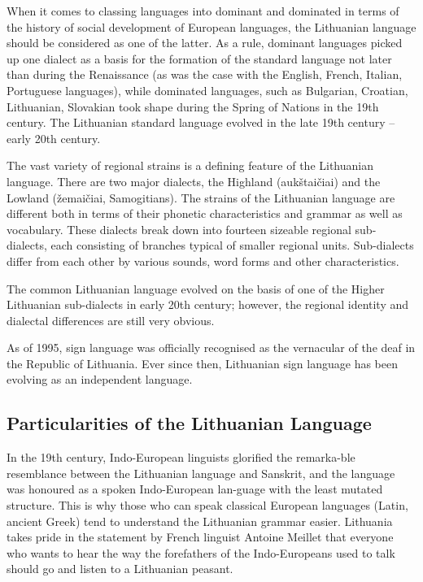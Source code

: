 \documentclass[]{../metanetpaper}
\begin{document}
\begin{multicols}{2}
    When it comes to classing languages into dominant and dominated in terms of the history of social development of European languages, the Lithuanian language should be considered as one of the latter. As a rule, dominant languages picked up one dialect as a basis for the formation of the standard language not later than during the Renaissance (as was the case with the English, French, Italian, Portuguese languages), while dominated languages, such as Bulgarian, Croatian, Lithuanian, Slovakian took shape during the Spring of Nations in the 19th century. The Lithuanian standard language evolved in the late 19th century – early 20th century.

    The vast variety of regional strains is a defining feature of the Lithuanian language. There are two major dialects, the Highland (aukštaičiai) and the Lowland (žemaičiai, Samogitians). The strains of the Lithuanian language are different both in terms of their phonetic characteristics and grammar as well as vocabulary. These dialects break down into fourteen sizeable regional sub-dialects, each consisting of branches typical of smaller regional units. Sub-dialects differ from each other by various sounds, word forms and other characteristics.

The common Lithuanian language evolved on the basis of one of the Higher Lithuanian sub-dialects in early 20th century; however, the regional identity and dialectal differences are still very obvious.

As of 1995, sign language was officially recognised as the vernacular of the deaf in the Republic of Lithuania. Ever since then, Lithuanian sign language has been evolving as an independent language.

\subsection{Particularities of the Lithuanian  Language}

In the 19th century, Indo-European linguists glorified the remarka-ble resemblance between the Lithuanian language and Sanskrit, and the language was honoured as a spoken Indo-European lan-guage with the least mutated structure. This is why those who can speak classical European languages (Latin, ancient Greek) tend to understand the Lithuanian grammar easier. Lithuania takes pride in the statement by French linguist Antoine Meillet that everyone who wants to hear the way the forefathers of the Indo-Europeans used to talk should go and listen to a Lithuanian peasant.


\end{multicols}
\end{document}
